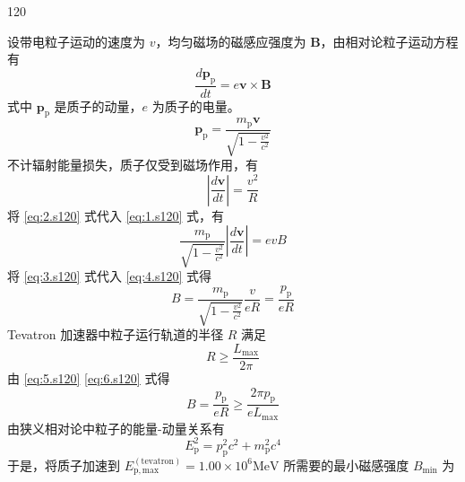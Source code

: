 \begin{solution}{120}
    \begin{subsolution}
        设带电粒子运动的速度为 $v$，均匀磁场的磁感应强度为 $\mathbf{B}$，由相对论粒子运动方程有
        \begin{equation}
            \frac{d \mathbf{p}_{\mathrm{p}}}{d t} = e \mathbf{v} \times \mathbf{B}
            \label{eq:1.s120}
        \end{equation}
        式中 $\mathbf{p}_{\mathrm{p}}$ 是质子的动量，$e$ 为质子的电量。
        \begin{equation}
            \mathbf{p}_{\mathrm{p}} = \frac{m_{\mathrm{p}} \mathbf{v}}{\sqrt{1 - \frac{v^{2}}{c^{2}}}}
            \label{eq:2.s120}
        \end{equation}
        不计辐射能量损失，质子仅受到磁场作用，有
        \begin{equation}
            \left| \frac{d \mathbf{v}}{d t} \right| = \frac{v^{2}}{R}
            \label{eq:3.s120}
        \end{equation}
        将 \eqref{eq:2.s120} 式代入 \eqref{eq:1.s120} 式，有
        \begin{equation}
            \frac{m_{\mathrm{p}}}{\sqrt{1 - \frac{v^{2}}{c^{2}}}} \left| \frac{d \mathbf{v}}{d t} \right| = e v B
            \label{eq:4.s120}
        \end{equation}
        将 \eqref{eq:3.s120} 式代入 \eqref{eq:4.s120} 式得
        \begin{equation}
            B = \frac{m_{\mathrm{p}}}{\sqrt{1 - \frac{v^{2}}{c^{2}}}} \frac{v}{e R} = \frac{p_{\mathrm{p}}}{e R}
            \label{eq:5.s120}
        \end{equation}
        Tevatron 加速器中粒子运行轨道的半径 $R$ 满足
        \begin{equation}
            R \geq \frac{L_{\max}}{2 \pi}
            \label{eq:6.s120}
        \end{equation}
        由 \eqref{eq:5.s120} \eqref{eq:6.s120} 式得
        \begin{equation}
            B = \frac{p_{\mathrm{p}}}{e R} \geq \frac{2 \pi p_{\mathrm{p}}}{e L_{\max}}
            \label{eq:7.s120}
        \end{equation}
        由狭义相对论中粒子的能量-动量关系有
        \begin{equation}
            E_{\mathrm{p}}^{2} = p_{\mathrm{p}}^{2} c^{2} + m_{\mathrm{p}}^{2} c^{4}
            \label{eq:8.s120}
        \end{equation}
        于是，将质子加速到 $E_{\mathrm{p,max}}^{(\mathrm{tevatron})} = 1.00 \times 10^{6} \mathrm{MeV}$ 所需要的最小磁感强度 $B_{\min}$ 为

\end{subsolution}
\end{solution}

